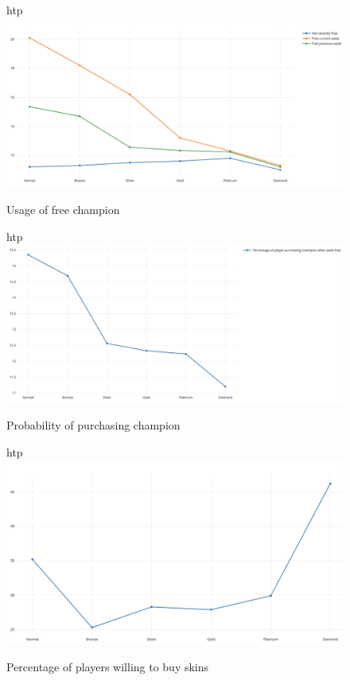 \documentclass[sigconf]{acmart}
\begin{document}
\begin{figure}{htp}
\centering
\includegraphics[width=1.0\columnwidth]{images/WechatIMG112.jpeg}
\caption{Usage of free champion}
\label{Figure 1}
\end{figure}
\begin{figure}{htp}
\centering
\includegraphics[width=1.0\columnwidth]{images/WechatIMG114.jpeg}
\caption{Probability of purchasing champion}
\label{Figure 2}
\end{figure}
\begin{figure}{htp}
\centering
\includegraphics[width=1.0\columnwidth]{images/WechatIMG115.jpeg}
\caption{Percentage of players willing to buy skins}
\label{Figure 3}
\end{figure}
\end{document}
